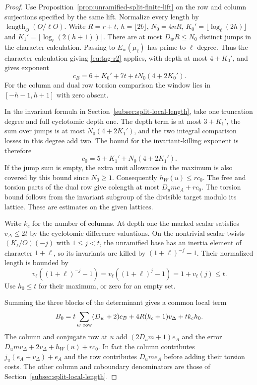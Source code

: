 \begin{proof}
Use Proposition~\ref{prop:unramified-split-finite-lift} on the
row and column surjections specified by the same lift.
Normalize every length by \(\operatorname{length}_O(O/\ell O)\).
Write \(R=r+t\), \(h=\lfloor2b\rfloor\),
\(N_0=4nR\), \(K_0'=\lfloor\log_\ell(2h)\rfloor\) and
\(K_1'=\lfloor\log_\ell(2(h+1))\rfloor\).
There are at most \(D_wR\le N_0\) distinct jumps in the
character calculation. Passing to \(E_w(\mu_\ell)\) has
prime-to-\(\ell\) degree. Thus the character calculation giving
\eqref{eq:tag-r2} applies, with depth at most \(4+K_0'\), and gives exponent
\[
 c_B=6+K_0'+7t+tN_0(4+2K_0').
\]
For the column and dual row torsion comparison the window lies in
\([-h-1,h+1]\) with zero absent.

In the invariant formula in
Section~\ref{subsec:split-local-length}, take one truncation
degree and full cyclotomic depth one. The depth term is at most
\(3+K_1'\), the sum over jumps is at most \(N_0(4+2K_1')\),
and the two integral comparison losses in this degree add two.
The bound for the invariant-killing exponent is therefore
\[
 c_0=5+K_1'+N_0(4+2K_1').
\]
If the jump sum is empty, the extra unit allowance in the
maximum is also covered by this bound since \(N_0\ge1\).
Consequently \(h_W(u)\le rc_0\).
The free and torsion parts of the dual row give colength at
most \(D_um e_A+rc_0\). The torsion bound follows from the
invariant subgroup of the divisible target modulo its lattice.
These are estimates on the given lattices. \label{cor:unramified-split-length-5}

Write \(k_c\) for the number of columns. At depth one the
marked scalar satisfies \(v_\Delta\le 2t\) by the cyclotomic
difference valuations. On the nontrivial scalar twists
\((K_\ell/O)(-j)\) with \(1\le j<t\), the unramified base has
an inertia element of character \(1+\ell\), so its invariants are killed by \((1+\ell)^{-j}-1\). Their
normalized length is bounded by
\[
 v_\ell((1+\ell)^{-j}-1)=v_\ell((1+\ell)^j-1)
                         =1+v_\ell(j)\le t .
\] Use \(h_0\le t\) for
their maximum, or zero for an empty set.

Summing the three
blocks of the determinant gives a common local term
\[
 B_0=t\sum_{w\ {\rm row}}(D_w+2)c_B
       +4R(k_c+1)v_\Delta+tk_ch_0 .
\]
The column and conjugate row at \(u\) add
\((2D_um+1)e_A\) and the error
\(D_umv_\Delta+2v_\Delta+h_W(u)+rc_0\).
In fact the column contributes \(j_u(e_A+v_\Delta)+e_A\)
and the row contributes \(D_um e_A\) before adding their
torsion costs. The other column and coboundary denominators
are those of Section~\ref{subsec:split-local-length}.


\end{proof}
